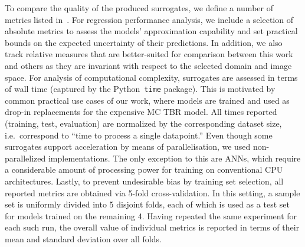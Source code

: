 To compare the quality of the produced surrogates, we define a number of metrics listed
in~. For regression performance analysis, we include a
selection of absolute metrics to assess the models' approximation capability and set
practical bounds on the expected uncertainty of their predictions. In addition, we also track
relative measures that are better-suited for comparison between this work and others as
they are invariant with respect to the selected domain and image space.
For analysis of computational complexity, surrogates are assessed in terms of wall
time (captured by the Python~\texttt{time} package). This is motivated by common practical use
cases of our work, where models are trained and used as drop-in replacements for the
expensive MC TBR model. All times reported (training, test, evaluation) are
normalized by the corresponding dataset size, i.e.~correspond to ``time to
process a single datapoint.''
Even though some surrogates support acceleration by means of parallelisation, we
used non-parallelized implementations. The only exception to this are ANNs,
which require a considerable amount of processing power for training on
conventional CPU architectures. Lastly, to prevent undesirable bias by training
set selection, all reported metrics are obtained via 5-fold cross-validation.
In this setting, a sample set is uniformly divided into 5 disjoint folds, each of which
is used as a test set for models trained on the remaining 4. Having repeated the
same experiment for each such run, the overall value of individual metrics is
reported in terms of their mean and standard deviation over all folds.


